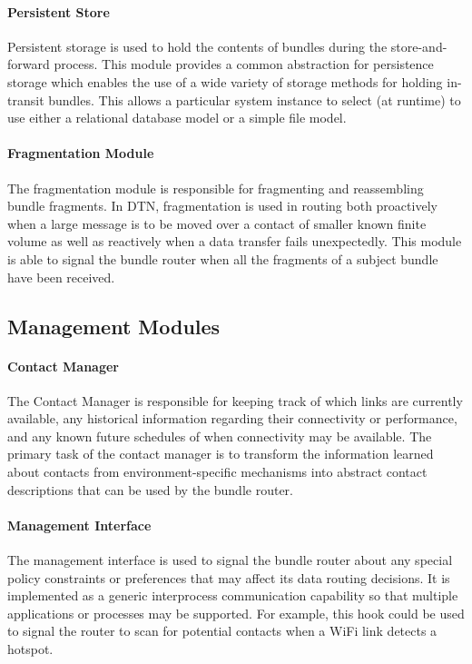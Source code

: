 \paragraph{Persistent Store}
Persistent storage is used to hold the contents of bundles during the store-and-forward process. This module provides a common abstraction for persistence storage which enables
the use of a wide variety of storage methods for holding in-transit bundles. This allows a particular system instance to select (at runtime) to use either a relational
database model or a simple file model.

\paragraph{Fragmentation Module}
The fragmentation module is responsible for fragmenting and reassembling bundle fragments. In DTN, fragmentation is used in routing both proactively when a large
message is to be moved over a contact of smaller known finite volume as well as reactively when a data 
transfer fails unexpectedly. This module is able to signal the bundle router when all the fragments of a subject bundle have
been received.

\subsection{Management Modules}

\paragraph{Contact Manager}
The Contact Manager is responsible for keeping track of which links are currently available, any historical information regarding their connectivity or performance,
and any known future schedules of when connectivity may be available. The primary task of the contact manager is to
transform the information learned about contacts from environment-specific mechanisms into abstract contact descriptions that can be used by the bundle router.

\paragraph{Management Interface}
The management interface is used to signal the bundle router about any special policy constraints or preferences
that may affect its data routing decisions. It is implemented as a generic interprocess communication capability so that multiple applications or processes may be
supported. For example, this hook could be used to signal the router to scan for potential contacts when a WiFi link detects a hotspot.

